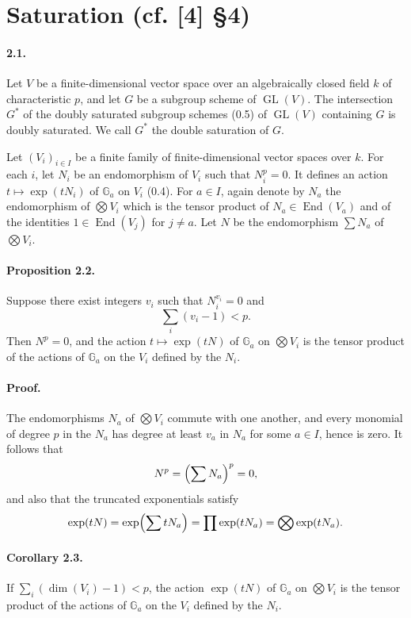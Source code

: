 \documentclass[11pt]{article}
\newcommand{\Ga}{\mathbb{G}_a}
\newcommand{\GL}{\operatorname{GL}}
\newcommand{\End}{\operatorname{End}}
\theoremstyle{plain}
\theoremstyle{definition}
\begin{document}
\section{Saturation (cf. [4] \S4)}
\paragraph{2.1.} Let $V$ be a finite-dimensional vector space over an algebraically closed field $k$ of characteristic $p$, and let $G$ be a subgroup scheme of $\GL(V)$. The intersection $G^*$ of the doubly saturated subgroup schemes (0.5) of $\GL(V)$ containing $G$ is doubly saturated. We call $G^*$ the double saturation of $G$.

Let $(V_i)_{i\in I}$ be a finite family of finite-dimensional vector spaces over $k$. For each $i$, let $N_i$ be an endomorphism of $V_i$ such that $N_i^p=0$. It defines an action $t\mapsto\exp(tN_i)$ of $\Ga$ on $V_i$ (0.4). For $a\in I$, again denote by $N_a$ the endomorphism of $\bigotimes V_i$ which is the tensor product of $N_a\in\End(V_a)$ and of the identities $1\in\End(V_j)$ for $j\ne a$. Let $N$ be the endomorphism $\sum N_a$ of $\bigotimes V_i$.

\paragraph{Proposition 2.2.} Suppose there exist integers $v_i$ such that $N_i^{v_i}=0$ and
\[
   \sum_i(v_i-1)<p.
\]
Then $N^p=0$, and the action $t\mapsto\exp(tN)$ of $\Ga$ on $\bigotimes V_i$ is the tensor product of the actions of $\Ga$ on the $V_i$ defined by the $N_i$.

\paragraph{Proof.} The endomorphisms $N_a$ of $\bigotimes V_i$ commute with one another, and every monomial of degree $p$ in the $N_a$ has degree at least $v_a$ in $N_a$ for some $a\in I$, hence is zero. It follows that
\[
   N^p=\Bigl(\sum N_a\Bigr)^p=0,
\]
and also that the truncated exponentials satisfy
\[
   \exp(tN)=\exp\Bigl(\sum tN_a\Bigr)=\prod \exp(tN_a)=\bigotimes \exp(tN_a).
\]

\paragraph{Corollary 2.3.} If $\sum_i(\dim(V_i)-1)<p$, the action $\exp(tN)$ of $\Ga$ on $\bigotimes V_i$ is the tensor product of the actions of $\Ga$ on the $V_i$ defined by the $N_i$.
\end{document}
